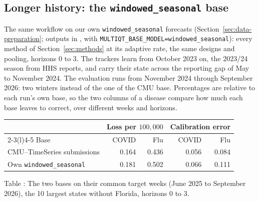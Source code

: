 \documentclass[11pt,a4paper]{article}
\theoremstyle{definition}
\theoremstyle{remark}
\begin{document}
\subsection{Longer history: the \texttt{windowed\_seasonal} base}
\label{sec:results-longer-history}
The same workflow on our own \texttt{windowed\_seasonal} forecasts
(Section~\ref{sec:data-preparation}; outputs in
, with
\texttt{MULTIQT\_BASE\_\allowbreak MODEL=\allowbreak windowed\_seasonal}): every method of
Section~\ref{sec:methods} at its adaptive rate, the same designs and
pooling, horizons $0$ to $3$. The trackers learn from October 2023 on,
the 2023/24 season from HHS reports, and carry their state across the
reporting gap of May to November 2024. The evaluation runs from November
2024 through September 2026: two winters instead of the one of the CMU
base. Percentages are relative to each run's own base, so the two columns
of a disease compare how much each base leaves to correct, over different
weeks and horizons.

\begin{center}\small
\renewcommand{\arraystretch}{1.12}
\begin{tabular}{@{}lrrrr@{}}
\toprule
 & \multicolumn{2}{c}{Loss per $100{,}000$} & \multicolumn{2}{c}{Calibration error}\\
\cmidrule(lr){2-3}\cmidrule(l){4-5}
Base & COVID & Flu & COVID & Flu\\
\midrule
CMU--TimeSeries submissions & 0.164 & 0.436 & 0.056 & 0.084\\
Own \texttt{windowed\_seasonal} & 0.181 & 0.502 & 0.066 & 0.111\\
\bottomrule
\end{tabular}
\end{center}
\label{tab:longer-history-bases}
\begin{center}\small Table \thetable: The two bases on their common target
weeks (June 2025 to September 2026), the 10 largest states without Florida,
horizons $0$ to $3$.
\end{center}
\end{document}
